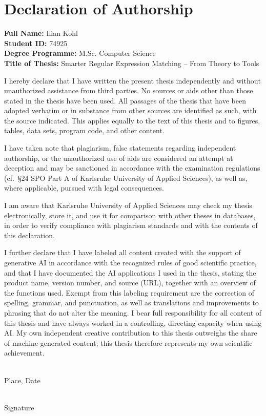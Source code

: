 \chapter*{Declaration of Authorship}

\noindent\textbf{Full Name:} Ilian Kohl\\
\textbf{Student ID:} 74925 \\
\textbf{Degree Programme:} M.Sc. Computer Science\\
\textbf{Title of Thesis:} Smarter Regular Expression Matching -- From Theory to Tools

\vspace{0.8cm}

\noindent
I hereby declare that I have written the present thesis independently
and without unauthorized assistance from third parties. No sources or
aids other than those stated in the thesis have been used. All
passages of the thesis that have been adopted verbatim or in substance
from other sources are identified as such, with the source indicated.
This applies equally to the text of this thesis and to figures,
tables, data sets, program code, and other content.

I have taken note that plagiarism, false statements regarding
independent authorship, or the unauthorized use of aids are considered
an attempt at deception and may be sanctioned in accordance with the
examination regulations (cf.\ \S24 SPO Part A of Karlsruhe University
of Applied Sciences), as well as, where applicable, pursued with legal
consequences.

I am aware that Karlsruhe University of Applied Sciences may check my
thesis electronically, store it, and use it for comparison with other
theses in databases, in order to verify compliance with plagiarism
standards and with the contents of this declaration.

I further declare that I have labeled all content created with the
support of generative AI in accordance with the recognized rules of
good scientific practice, and that I have documented the AI
applications I used in the thesis, stating the product name, version
number, and source (URL), together with an overview of the functions
used. Exempt from this labeling requirement are the correction of
spelling, grammar, and punctuation, as well as translations and
improvements to phrasing that do not alter the meaning. I bear full
responsibility for all content of this thesis and have always worked
in a controlling, directing capacity when using AI. My own independent
creative contribution to this thesis outweighs the share of
machine-generated content; this thesis therefore represents my own
scientific achievement.

\vspace{1.2cm}

\noindent
\begin{minipage}{0.45\textwidth}
\hrulefill\\[0.2em]
Place, Date
\end{minipage}
\hfill
\begin{minipage}{0.45\textwidth}
\hrulefill\\[0.2em]
Signature
\end{minipage}